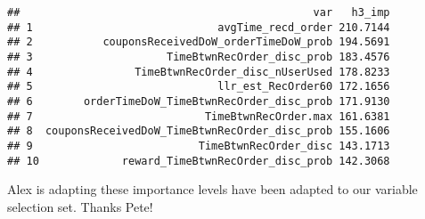 \documentclass[10pt]{report}
\newenvironment{Shaded}{}{}
\newcommand{\KeywordTok}[1]{\textcolor[rgb]{0.00,0.44,0.13}{\textbf{{#1}}}}
\newcommand{\DecValTok}[1]{\textcolor[rgb]{0.25,0.63,0.44}{{#1}}}
\newcommand{\StringTok}[1]{\textcolor[rgb]{0.25,0.44,0.63}{{#1}}}
\newcommand{\NormalTok}[1]{{#1}}
\begin{document}
\begin{Shaded}
\end{Shaded}

\begin{verbatim}
##                                              var   h3_imp
## 1                             avgTime_recd_order 210.7144
## 2           couponsReceivedDoW_orderTimeDoW_prob 194.5691
## 3                     TimeBtwnRecOrder_disc_prob 183.4576
## 4                TimeBtwnRecOrder_disc_nUserUsed 178.8233
## 5                             llr_est_RecOrder60 172.1656
## 6        orderTimeDoW_TimeBtwnRecOrder_disc_prob 171.9130
## 7                           TimeBtwnRecOrder.max 161.6381
## 8  couponsReceivedDoW_TimeBtwnRecOrder_disc_prob 155.1606
## 9                          TimeBtwnRecOrder_disc 143.1713
## 10             reward_TimeBtwnRecOrder_disc_prob 142.3068
\end{verbatim}

Alex is adapting these importance levels have been adapted to our
variable selection set. Thanks Pete!
\end{document}
